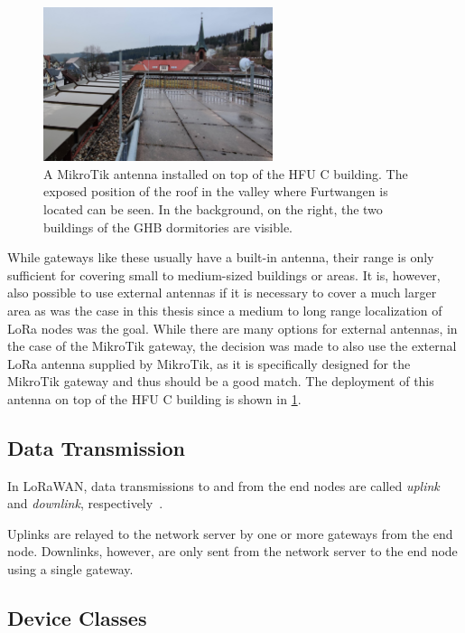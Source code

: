 \begin{figure}[htbp]
    \centering
    \includegraphics[width=0.6\textwidth]{pictures/hardware/gateway-deployment/mikrotik-antenna-c-building.jpg}
    \caption{
        A MikroTik antenna installed on top of the \ac{HFU} C building.
        The exposed position of the roof in the valley where Furtwangen is located can be seen.
        In the background, on the right, the two buildings of the \ac{GHB} dormitories are visible.
    }\label{pic:mikrotik-antenna-c-building}
\end{figure}

While gateways like these usually have a built-in antenna, their range is only sufficient for covering small to medium-sized buildings or areas.
It is, however, also possible to use external antennas if it is necessary to cover a much larger area as was the case in this thesis since a medium to long range localization of \ac{LoRa} nodes was the goal.
While there are many options for external antennas, in the case of the MikroTik gateway, the decision was made to also use the external \ac{LoRa} antenna supplied by MikroTik, as it is specifically designed for the MikroTik gateway and thus should be a good match.
The deployment of this antenna on top of the \ac{HFU} C building is shown in \cref{pic:mikrotik-antenna-c-building}.

\subsection{Data Transmission}

In LoRaWAN, data transmissions to and from the end nodes are called \emph{uplink} and \emph{downlink}, respectively~\cite[p. 12]{lora_alliance_inc_lorawan_2017}.

Uplinks are relayed to the network server by one or more gateways from the end node.
Downlinks, however, are only sent from the network server to the end node using a single gateway.
\subsection{Device Classes}

